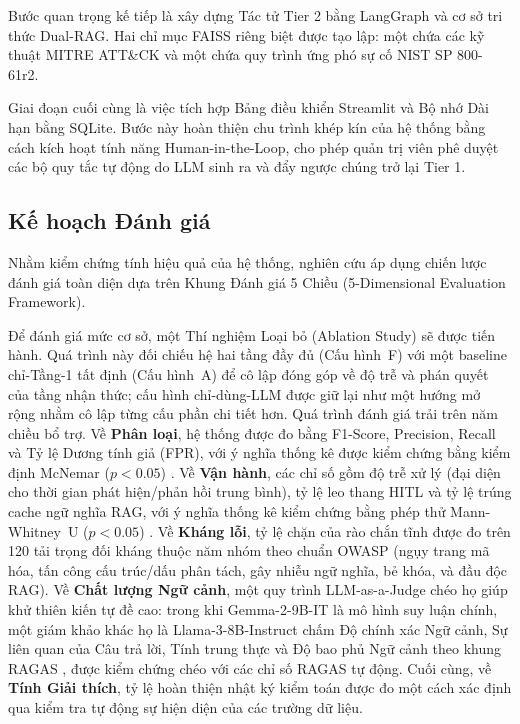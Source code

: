 \documentclass[12pt,a4paper]{article}
\begin{document}
Bước quan trọng kế tiếp là xây dựng Tác tử Tier 2 bằng LangGraph và cơ sở tri thức Dual-RAG. Hai chỉ mục FAISS riêng biệt được tạo lập: một chứa các kỹ thuật MITRE ATT\&CK và một chứa quy trình ứng phó sự cố NIST SP 800-61r2.

Giai đoạn cuối cùng là việc tích hợp Bảng điều khiển Streamlit và Bộ nhớ Dài hạn bằng SQLite. Bước này hoàn thiện chu trình khép kín của hệ thống bằng cách kích hoạt tính năng Human-in-the-Loop, cho phép quản trị viên phê duyệt các bộ quy tắc tự động do LLM sinh ra và đẩy ngược chúng trở lại Tier 1.

\subsection{Kế hoạch Đánh giá}
Nhằm kiểm chứng tính hiệu quả của hệ thống, nghiên cứu áp dụng chiến lược đánh giá toàn diện dựa trên Khung Đánh giá 5 Chiều (5-Dimensional Evaluation Framework).

Để đánh giá mức cơ sở, một Thí nghiệm Loại bỏ (Ablation Study) sẽ được tiến hành. Quá trình này đối chiếu hệ hai tầng đầy đủ (Cấu hình~F) với một baseline chỉ-Tầng-1 tất định (Cấu hình~A) để cô lập đóng góp về độ trễ và phán quyết của tầng nhận thức; cấu hình chỉ-dùng-LLM được giữ lại như một hướng mở rộng nhằm cô lập từng cấu phần chi tiết hơn.
Quá trình đánh giá trải trên năm chiều bổ trợ. Về \textbf{Phân loại}, hệ thống được đo bằng F1-Score, Precision, Recall và Tỷ lệ Dương tính giả (FPR), với ý nghĩa thống kê được kiểm chứng bằng kiểm định McNemar ($p<0.05$) \cite{mcnemar1947}. Về \textbf{Vận hành}, các chỉ số gồm độ trễ xử lý (đại diện cho thời gian phát hiện/phản hồi trung bình), tỷ lệ leo thang HITL và tỷ lệ trúng cache ngữ nghĩa RAG, với ý nghĩa thống kê kiểm chứng bằng phép thử Mann-Whitney~U ($p<0.05$) \cite{mannwhitney1947}. Về \textbf{Kháng lỗi}, tỷ lệ chặn của rào chắn tĩnh được đo trên 120 tải trọng đối kháng thuộc năm nhóm theo chuẩn OWASP \cite{owasp2025} (ngụy trang mã hóa, tấn công cấu trúc/dấu phân tách, gây nhiễu ngữ nghĩa, bẻ khóa, và đầu độc RAG). Về \textbf{Chất lượng Ngữ cảnh}, một quy trình LLM-as-a-Judge chéo họ giúp khử thiên kiến tự đề cao: trong khi Gemma-2-9B-IT là mô hình suy luận chính, một giám khảo khác họ là Llama-3-8B-Instruct chấm Độ chính xác Ngữ cảnh, Sự liên quan của Câu trả lời, Tính trung thực và Độ bao phủ Ngữ cảnh theo khung RAGAS \cite{ragas2023}, được kiểm chứng chéo với các chỉ số RAGAS tự động. Cuối cùng, về \textbf{Tính Giải thích}, tỷ lệ hoàn thiện nhật ký kiểm toán được đo một cách xác định qua kiểm tra tự động sự hiện diện của các trường dữ liệu.
\end{document}
